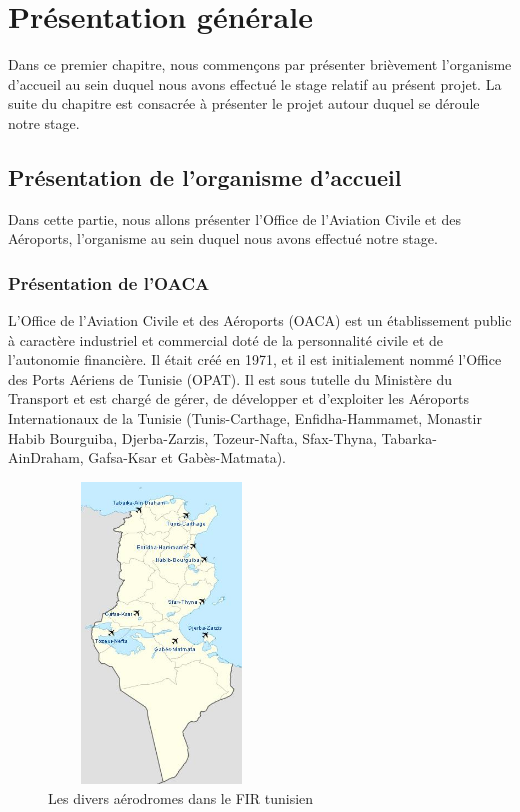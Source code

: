 \chapter{Présentation générale}

Dans ce premier chapitre, nous commençons par présenter brièvement l'organisme d'accueil au sein duquel nous avons effectué le stage relatif au présent projet. La suite du chapitre est consacrée à présenter le projet autour duquel se déroule notre stage.
\section{Présentation de l’organisme d’accueil }

Dans cette partie, nous allons présenter l'Office de l'Aviation Civile et des Aéroports, l'organisme au sein duquel nous avons effectué notre stage. 
\subsection{Présentation de l’OACA}

L’Office de l’Aviation Civile et des Aéroports (OACA) est un établissement public à caractère industriel et commercial doté de la personnalité civile et de l'autonomie financière. Il était créé en 1971, et il est initialement nommé l’Office des Ports Aériens de Tunisie (OPAT). Il est sous tutelle du Ministère du Transport et est chargé de gérer, de développer et d'exploiter les Aéroports Internationaux de la Tunisie (Tunis-Carthage, Enfidha-Hammamet, Monastir Habib Bourguiba, Djerba-Zarzis, Tozeur-Nafta, Sfax-Thyna, Tabarka-AinDraham, Gafsa-Ksar et Gabès-Matmata).\\


\begin{figure}[!h]
\begin{center}
\includegraphics[width=6cm,height=8cm]{presentation/pres1.jpg}
\end{center}
\caption{Les divers aérodromes dans le FIR tunisien}
\end{figure}

